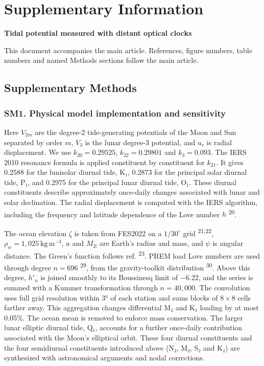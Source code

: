 \documentclass[
  11pt,
  a4paper,
]{article}
\author{}
\date{}
\begin{document}
\onehalfspacing
\linenumbers

\hypertarget{supplementary-information}{%
\section{Supplementary Information}\label{supplementary-information}}

\textbf{Tidal potential measured with distant optical clocks}

This document accompanies the main article. References, figure numbers,
table numbers and named Methods sections follow the main article.

\hypertarget{supplementary-methods}{%
\subsection{Supplementary Methods}\label{supplementary-methods}}

\hypertarget{sm1.-physical-model-implementation-and-sensitivity}{%
\subsubsection{SM1. Physical model implementation and
sensitivity}\label{sm1.-physical-model-implementation-and-sensitivity}}

Here \(V_{2m}\) are the degree-2 tide-generating potentials of the Moon
and Sun separated by order \(m\), \(V_3\) is the lunar degree-3
potential, and \(u_r\) is radial displacement. We use
\(k_{20}=0.29525\), \(k_{22}=0.29801\) and \(k_3=0.093\). The IERS 2010
resonance formula is applied constituent by constituent for \(k_{21}\).
It gives 0.2588 for the lunisolar diurnal tide, K₁, 0.2873 for the
principal solar diurnal tide, P₁, and 0.2975 for the principal lunar
diurnal tide, O₁. These diurnal constituents describe approximately
once-daily changes associated with lunar and solar declination. The
radial displacement is computed with the IERS algorithm, including the
frequency and latitude dependence of the Love number \(h\)
\textsuperscript{20}.

The ocean elevation \(\zeta\) is taken from FES2022 on a \(1/30^\circ\)
grid \textsuperscript{21,22}, \(\rho_w=1,025\ \mathrm{kg\,m^{-3}}\),
\(a\) and \(M_E\) are Earth's radius and mass, and \(\psi\) is angular
distance. The Green's function follows ref. \textsuperscript{23}. PREM
load Love numbers are used through degree \(n=696\)
\textsuperscript{29}, from the gravity-toolkit distribution
\textsuperscript{30}. Above this degree, \(h'_n\) is joined smoothly to
its Boussinesq limit of −6.22, and the series is summed with a Kummer
transformation through \(n=40,000\). The convolution uses full grid
resolution within 3° of each station and sums blocks of \(8\times8\)
cells farther away. This aggregation changes differential M₂ and K₁
loading by at most 0.05\%. The ocean mean is removed to enforce mass
conservation. The larger lunar elliptic diurnal tide, Q₁, accounts for a
further once-daily contribution associated with the Moon's elliptical
orbit. These four diurnal constituents and the four semidiurnal
constituents introduced above (N₂, M₂, S₂ and K₂) are synthesized with
astronomical arguments and nodal corrections.
\end{document}
